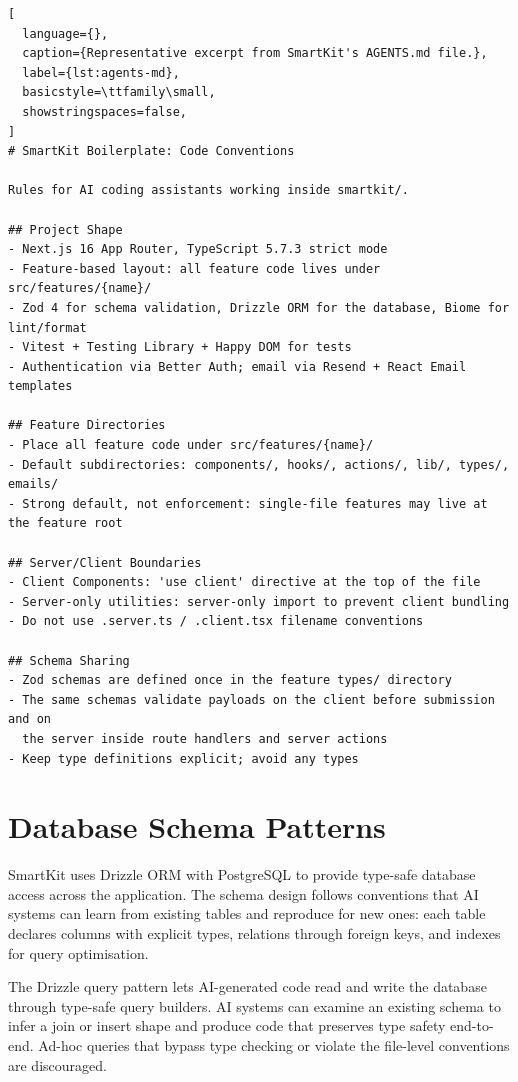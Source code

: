 \documentclass[12pt,a4paper]{report}
\begin{document}
\begin{lstlisting}[
  language={},
  caption={Representative excerpt from SmartKit's AGENTS.md file.},
  label={lst:agents-md},
  basicstyle=\ttfamily\small,
  showstringspaces=false,
]
# SmartKit Boilerplate: Code Conventions

Rules for AI coding assistants working inside smartkit/.

## Project Shape
- Next.js 16 App Router, TypeScript 5.7.3 strict mode
- Feature-based layout: all feature code lives under src/features/{name}/
- Zod 4 for schema validation, Drizzle ORM for the database, Biome for lint/format
- Vitest + Testing Library + Happy DOM for tests
- Authentication via Better Auth; email via Resend + React Email templates

## Feature Directories
- Place all feature code under src/features/{name}/
- Default subdirectories: components/, hooks/, actions/, lib/, types/, emails/
- Strong default, not enforcement: single-file features may live at the feature root

## Server/Client Boundaries
- Client Components: 'use client' directive at the top of the file
- Server-only utilities: server-only import to prevent client bundling
- Do not use .server.ts / .client.tsx filename conventions

## Schema Sharing
- Zod schemas are defined once in the feature types/ directory
- The same schemas validate payloads on the client before submission and on
  the server inside route handlers and server actions
- Keep type definitions explicit; avoid any types
\end{lstlisting}

\section{Database Schema Patterns}

SmartKit uses Drizzle ORM with PostgreSQL to provide type-safe database access across the application. The schema design follows conventions that AI systems can learn from existing tables and reproduce for new ones: each table declares columns with explicit types, relations through foreign keys, and indexes for query optimisation.

The Drizzle query pattern lets AI-generated code read and write the database through type-safe query builders. AI systems can examine an existing schema to infer a join or insert shape and produce code that preserves type safety end-to-end. Ad-hoc queries that bypass type checking or violate the file-level conventions are discouraged.
\end{document}
